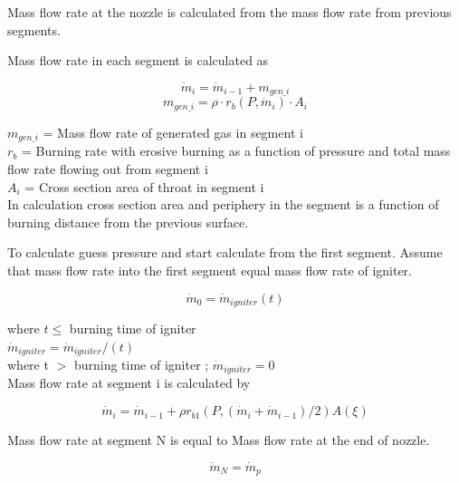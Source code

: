 \documentclass[conference]{IEEEtran}
\begin{document}
Mass flow rate at the nozzle is calculated from the mass flow rate from previous segments.

Mass flow rate in each segment is calculated as 
\begin{center}
\begin{equation}
\dot{m}_{i} = \dot{m}_{i-1}+{m}_{gen\_i}
\end{equation}
\begin{equation}
{m}_{gen\_i} = \rho\cdot{r}_b(P,\dot{m}_{i})\cdot{A}_i
\end{equation}
\end{center}
${m}_{gen\_i}$ = Mass flow rate of generated gas in segment i\\
${r}_b$ = Burning rate with erosive burning as a function of pressure and total mass flow rate flowing out from segment i\\		
${A}_i$ = Cross section area of throat in segment i\\

In calculation cross section area and periphery in the segment is a function of burning distance from the previous surface. 

To calculate guess pressure and start calculate from the first segment. Assume that mass flow rate into the first segment equal mass flow rate of igniter. 	
\begin{center}
\begin{equation}\dot{m}_{0} = \dot{m}_{igniter}(t)
\end{equation}
\end{center}
where $t \leq$ burning time of igniter\\
$\dot{m}_{igniter} = \dot{m}_{igniter}/(t)$\\
where t $>$ burning time of igniter ; $\dot{m}_{igniter}=0$\\

Mass flow rate at segment i is calculated by 
\begin{center}
\begin{equation}
\dot{m}_{i} = \dot{m}_{i-1}+\rho{r}_{b1}(P,(\dot{m}_{i}+\dot{m}_{i-1})/2)A(\xi)
\end{equation}
\end{center}

Mass flow rate at segment N is equal to Mass flow rate at the end of nozzle.
\begin{center}
\begin{equation}
\dot{m}_{N} = \dot{m}_{p}
\end{equation}
\end{center}
\end{document}
